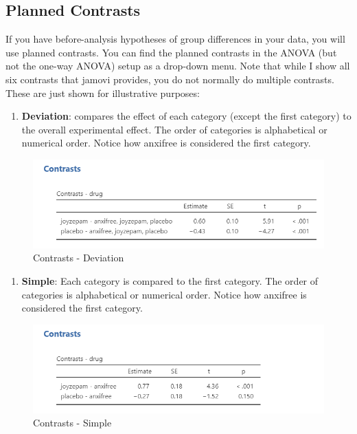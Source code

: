 \documentclass[
]{book}
\providecommand{\tightlist}{%
  \setlength{\itemsep}{0pt}\setlength{\parskip}{0pt}}
\begin{document}
\hypertarget{planned-contrasts}{%
\subsection{Planned Contrasts}\label{planned-contrasts}}

If you have before-analysis hypotheses of group differences in your data, you will use planned contrasts. You can find the planned contrasts in the ANOVA (but not the one-way ANOVA) setup as a drop-down menu. Note that while I show all six contrasts that jamovi provides, you do not normally do multiple contrasts. These are just shown for illustrative purposes:

\begin{enumerate}
\def\labelenumi{\arabic{enumi}.}
\tightlist
\item
  \textbf{Deviation}: compares the effect of each category (except the first category) to the overall experimental effect. The order of categories is alphabetical or numerical order. Notice how anxifree is considered the first category.
\end{enumerate}

\begin{figure}

{\centering \includegraphics[width=1\linewidth]{images/04_one-way-anova/contrasts_deviation} 

}

\caption{Contrasts - Deviation}\label{fig:unnamed-chunk-1}
\end{figure}

\begin{enumerate}
\def\labelenumi{\arabic{enumi}.}
\setcounter{enumi}{1}
\tightlist
\item
  \textbf{Simple}: Each category is compared to the first category. The order of categories is alphabetical or numerical order. Notice how anxifree is considered the first category.
\end{enumerate}

\begin{figure}

{\centering \includegraphics[width=1\linewidth]{images/04_one-way-anova/contrasts_simple} 

}

\caption{Contrasts - Simple}\label{fig:unnamed-chunk-2}
\end{figure}
\end{document}
